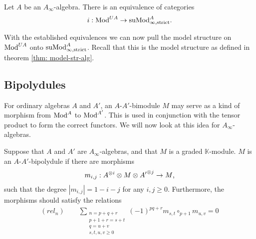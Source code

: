 \documentclass[../thesis.tex]{subfiles}
\begin{document}
            \begin{proposition}
                Let $A$ be an $A_\infty$-algebra. There is an equivalence of categories
                \begin{align*}
                    i : \tt{Mod}^{UA} \rightarrow \tt{suMod}_{\infty,\tt{strict}}^A\tt{.}
                \end{align*}
            \end{proposition}

            With the established equivalences we can now pull the model structure on $\tt{Mod}^{UA}$ onto $\tt{suMod}_{\infty,\tt{strict}}^A$. Recall that this is the model structure as defined in theorem \ref{thm: model-str-alg}.

        \subsection{Bipolydules}

            For ordinary algebras $A$ and $A'$, an $A$-$A'$-bimodule $M$ may serve as a kind of morphism from $\tt{Mod}^A$ to $\tt{Mod}^{A'}$. This is used in conjunction with the tensor product to form the correct functors. We will now look at this idea for $A_\infty$-algebras.

            \begin{definition}[$A$-$A'$-Bipolydule]
                Suppose that $A$ and $A'$ are $A_\infty$-algebras, and that $M$ is a graded $\mathbb{K}$-module. $M$ is an $A$-$A'$-bipolydule if there are morphisms
                \begin{align*}
                    m_{i,j} : A^{\otimes i} \otimes M \otimes {A'}^{\otimes j} \rightarrow M\tt{,}
                \end{align*}
                such that the degree $|m_{i,j}| = 1 - i - j$ for any $i,j \geq 0$. Furthermore, the morphisms should satisfy the relations
                \begin{align*}
                    (rel_n)\qquad \sum_{\substack{n = p + q + r \\ p + 1 + r = s + t \\ q = u + v \\ s,t,u,v \geq 0}}(-1)^{pq + r}m_{s,t}\circ_{p+1}m_{u,v} = 0
                \end{align*}
            \end{definition}
\end{document}
